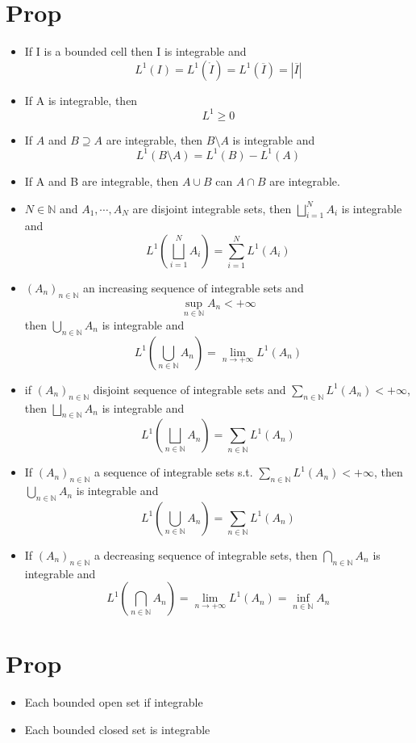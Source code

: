 \documentclass{book}
\newcommand{\abs}[1]{\left\lvert #1 \right\rvert}
\begin{document}
\section{Prop}
\begin{itemize}
    \item If I is a bounded cell then I is integrable and$$L^1(I)=L^1(\mathring{I})=L^1(\overline I)=\abs{\overline I}$$
    \item If A is integrable, then $$L^1\geq 0$$
    \item If $A$ and $B \supseteq A$ are integrable, then $B\setminus A$ is integrable and $$L^1(B\setminus A)=L^1(B)-L^1(A)$$
    \item If A and B are integrable, then $A\cup B$ can $A\cap B$ are integrable.
    \item $N\in\mathbb N$ and $A_1,\cdots, A_N$ are disjoint integrable sets, then $\bigsqcup\limits_{i=1}^N A_i$ is integrable and $$L^1(\bigsqcup\limits_{i=1}^N A_i)=\sum\limits_{i=1}^NL^1(A_i)$$
    \item $(A_n)_{n\in \mathbb N}$ an increasing sequence of integrable sets and $$\sup\limits_{n\in \mathbb N}A_n<+\infty$$ then $\bigcup\limits_{n\in \mathbb N}A_n$ is integrable and $$L^1(\bigcup\limits_{n\in \mathbb N}A_n)=\lim\limits_{n\to+\infty}L^1(A_n)$$
    \item if $(A_n)_{n\in \mathbb N}$ disjoint sequence of integrable sets and $\sum\limits_{n\in \mathbb N}L^1(A_n)<+\infty$, then $\bigsqcup\limits_{n\in \mathbb N}A_n$ is integrable and $$L^1(\bigsqcup\limits_{n\in \mathbb N}A_n)=\sum\limits_{n\in \mathbb N}L^1(A_n)$$
    \item If $(A_n)_{n\in \mathbb N}$ a sequence of integrable sets s.t. $\sum\limits_{n\in \mathbb N}L^1(A_n)<+\infty$, then $\bigcup\limits_{n\in \mathbb N}A_n$ is integrable and $$L^1(\bigcup\limits_{n\in \mathbb N}A_n)=\sum\limits_{n\in \mathbb N}L^1(A_n)$$
    \item If $(A_n)_{n\in\mathbb N}$ a decreasing sequence of integrable sets, then $\bigcap\limits_{n\in \mathbb N}A_n$ is integrable and $$L^1(\bigcap\limits_{n\in \mathbb N}A_n)=\lim\limits_{n\to+\infty}L^1(A_n)=\inf_{n\in\mathbb N}A_n$$
\end{itemize}
\section{Prop}
\begin{itemize}
    \item Each bounded open set if integrable
    \item Each bounded closed set is integrable
\end{itemize}
\end{document}
